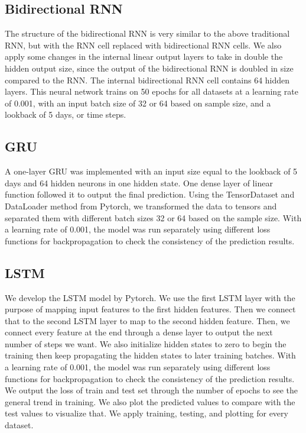 \documentclass[letterpaper, 10 pt, conference]{ieeeconf}  %
\begin{document}
    \subsection{Bidirectional RNN}
        The structure of the bidirectional RNN is very similar to the above traditional RNN, but with the RNN cell replaced with bidirectional RNN cells. We also apply some changes in the internal linear output layers to take in double the hidden output size, since the output of the bidirectional RNN is doubled in size compared to the RNN. The internal bidirectional RNN cell contains 64 hidden layers. This neural network trains on 50 epochs for all datasets at a learning rate of 0.001, with an input batch size of 32 or 64 based on sample size, and a lookback of 5 days, or time steps. 

    \subsection{GRU}
        A one-layer GRU was implemented with an input size equal to the lookback of 5 days and 64 hidden neurons in one hidden state. One dense layer of linear function followed it to output the final prediction. Using the TensorDataset and DataLoader method from Pytorch, we transformed the data to tensors and separated them with different batch sizes 32 or 64 based on the sample size. With a learning rate of 0.001, the model was run separately using different loss functions for backpropagation to check the consistency of the prediction results.

    \subsection{LSTM}
        We develop the LSTM model by Pytorch. We use the first LSTM layer with the purpose of mapping input features to the first hidden features. Then we connect that to the second LSTM layer to map to the second hidden feature. Then, we connect every feature at the end through a dense layer to output the next number of steps we want. We also initialize hidden states to zero to begin the training then keep propagating the hidden states to later training batches. With a learning rate of 0.001, the model was run separately using different loss functions for backpropagation to check the consistency of the prediction results. We output the loss of train and test set through the number of epochs to see the general trend in training. We also plot the predicted values to compare with the test values to visualize that. We apply training, testing, and plotting for every dataset.
\end{document}

